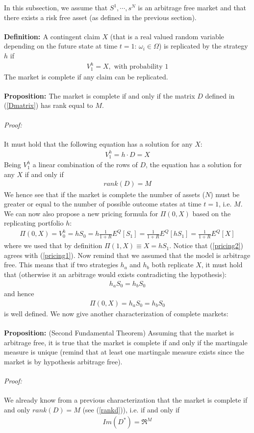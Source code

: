 \documentclass[a4paper,10pt]{report}
\theoremstyle{plain}
\theoremstyle{definition}
\newcommand\be{\begin{eqnarray}}    %
\newcommand\ee{\end{eqnarray}}
\newcommand{\DEF} {{\bf{Definition: }}}
\newcommand{\PROP} {{\bf{Proposition: }}}
\newcommand{\PROOF} {{\emph{Proof: \\ \\}}}
\begin{document}
In this subsection, we assume that $S^1, \cdots, s^N$ is an arbitrage free market and that there exists a risk free asset (as defined in the previous section). \\ \\
\DEF A contingent claim $X$ (that is a real valued random variable depending on the future state at time $t=1$: $\omega_i \in \Omega$) is replicated by the strategy $h$ if
\be 
V^h_1 = X, \mbox{ with probability $1$}
\ee
The market is complete if any claim can be replicated. \\ \\
\PROP The market is complete if and only if the matrix $D$ defined in (\ref{Dmatrix}) has rank equal to $M$. \\ \\
\PROOF It must hold that the following equation has a solution for any $X$:
\be
V_1^h = h\cdot D = X
\ee
Being $V_1^h$ a linear combination of the rows of $D$, the equation has a solution for any $X$ if and only if 
\be 
\label{rankd}
rank(D)=M 
\ee
 We hence see that if the market is complete the number of assets ($N$) must be greater or equal to the number of possible outcome states at time $t=1$, i.e. $M$.
We can now also propose a new pricing formula for $\Pi(0,X)$ based on the replicating portfolio $h$:
\be 
\Pi(0,X)=V^h_0 = h S_0 = h \frac{1}{1+R} E^Q\left[S_1 \right] =  \frac{1}{1+R} E^Q\left[h S_1 \right]= \frac{1}{1+R} E^Q\left[X \right]
\label{pricing2}
\ee
where we used that by definition $\Pi(1,X)\equiv X=h S_1$.
Notice that (\ref{pricing2}) agrees with (\ref{pricing1}).
Now remind that we assumed that the model is arbitrage free. This means that if two strategies $h_a$ and $h_b$ both replicate $X$, it must hold that (otherwise it an arbitrage would exists contradicting the hypothesis):
\be 
h_a S_0 = h_b S_0 
\ee 
and hence 
\be 
\Pi(0,X) = h_a S_0 = h_b S_0 
\ee
is well defined.
We now give another characterization of complete markets: \\ \\
\PROP (Second Fundamental Theorem) Assuming that the market is arbitrage free, it is true that the market is  complete if and only if the martingale measure is unique (remind that at least one martingale measure exists since the market is by hypothesis arbitrage free). \\ \\
\PROOF We already know from a previous characterization that the market is complete if and only $rank(D)=M$ (see (\ref{rankd})), i.e. if and only if 
\be 
Im\left( D^*\right) = \Re^M
\ee
\end{document}
